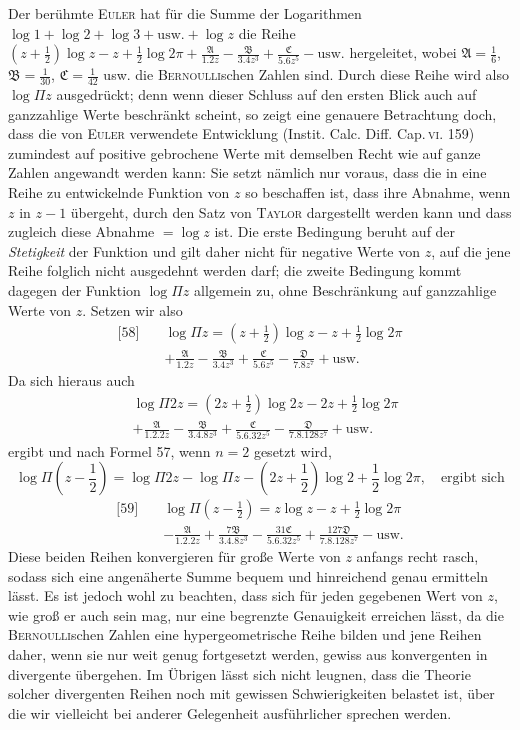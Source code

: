 Der berühmte \textsc{Euler} hat für die Summe der Logarithmen $\log1+\log2+\log3+\mathrm{usw.}+\log z$ die Reihe $(z+\frac12)\log z-z+\frac12\log2\pi
+\frac{\mathfrak A}{1.2z}-\frac{\mathfrak B}{3.4z^3}
+\frac{\mathfrak C}{5.6z^5}-\mathrm{usw.}$ hergeleitet, wobei $\mathfrak A=\frac16$, $\mathfrak B=\frac1{30}$, $\mathfrak C=\frac1{42}$ usw. die \textsc{Bernoulli}schen Zahlen sind. Durch diese Reihe wird also $\log\Pi z$ ausgedrückt; denn wenn dieser Schluss auf den ersten Blick auch auf ganzzahlige Werte beschränkt scheint, so zeigt eine genauere Betrachtung doch, dass die von \textsc{Euler} verwendete Entwicklung (Instit. Calc. Diff. Cap.\,\textsc{vi}. 159) zumindest auf positive gebrochene Werte mit demselben Recht wie auf ganze Zahlen angewandt werden kann: Sie setzt nämlich nur voraus, dass die in eine Reihe zu entwickelnde Funktion von $z$ so beschaffen ist, dass ihre Abnahme, wenn $z$ in $z-1$ übergeht, durch den Satz von \textsc{Taylor} dargestellt werden kann und dass zugleich diese Abnahme $=\log z$ ist. Die erste Bedingung beruht auf der \emph{Stetigkeit} der Funktion und gilt daher nicht für negative Werte von $z$, auf die jene Reihe folglich nicht ausgedehnt werden darf; die zweite Bedingung kommt dagegen der Funktion $\log\Pi z$ allgemein zu, ohne Beschränkung auf ganzzahlige Werte von $z$. Setzen wir also
\[
\begin{aligned}
{}\text{[58]}\quad &\log\Pi z=(z+\frac12)\log z-z+\frac12\log2\pi\\[4pt]
&+\frac{\mathfrak A}{1.2z}-\frac{\mathfrak B}{3.4z^3}
+\frac{\mathfrak C}{5.6z^5}-\frac{\mathfrak D}{7.8z^7}
+\mathrm{usw.}
\end{aligned}
\]
Da sich hieraus auch
\[
\begin{aligned}
&\log\Pi2z=(2z+\frac12)\log2z-2z+\frac12\log2\pi\\[4pt]
&+\frac{\mathfrak A}{1.2.2z}-\frac{\mathfrak B}{3.4.8z^3}
+\frac{\mathfrak C}{5.6.32z^5}-\frac{\mathfrak D}{7.8.128z^7}
+\mathrm{usw.}
\end{aligned}
\]
ergibt und nach Formel 57, wenn $n=2$ gesetzt wird,
\[
\log\Pi(z-\frac12)=\log\Pi2z-\log\Pi z
-(2z+\frac12)\log2+\frac12\log2\pi,\quad\text{ergibt sich}
\]
\[
\begin{aligned}
{}\text{[59]}\quad &\log\Pi(z-\frac12)=z\log z-z+\frac12\log2\pi\\[4pt]
&-\frac{\mathfrak A}{1.2.2z}+\frac{7\mathfrak B}{3.4.8z^3}
-\frac{31\mathfrak C}{5.6.32z^5}+\frac{127\mathfrak D}{7.8.128z^7}
-\mathrm{usw.}
\end{aligned}
\]
Diese beiden Reihen konvergieren für große Werte von $z$ anfangs recht rasch, sodass sich eine angenäherte Summe bequem und hinreichend genau ermitteln lässt. Es ist jedoch wohl zu beachten, dass sich für jeden gegebenen Wert von $z$, wie groß er auch sein mag, nur eine begrenzte Genauigkeit erreichen lässt, da die \textsc{Bernoulli}schen Zahlen eine hypergeometrische Reihe bilden und jene Reihen daher, wenn sie nur weit genug fortgesetzt werden, gewiss aus konvergenten in divergente übergehen. Im Übrigen lässt sich nicht leugnen, dass die Theorie solcher divergenten Reihen noch mit gewissen Schwierigkeiten belastet ist, über die wir vielleicht bei anderer Gelegenheit ausführlicher sprechen werden.
